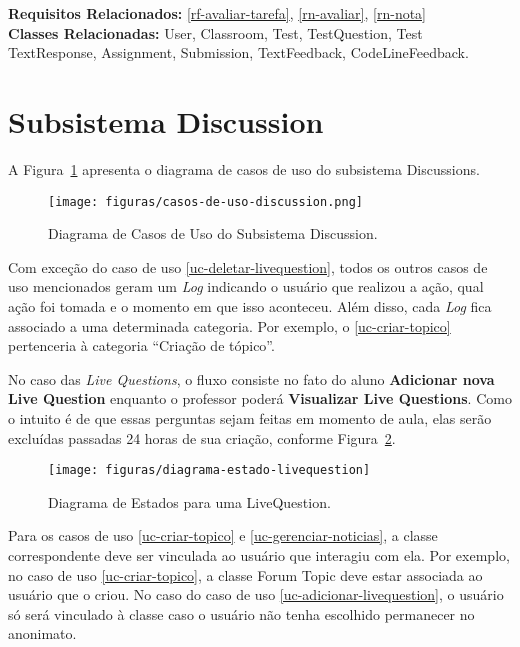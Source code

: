 \noindent  \textbf{Requisitos Relacionados:} \ref{rf-avaliar-tarefa}, \ref{rn-avaliar}, \ref{rn-nota}       \\ \textbf{Classes Relacionadas:} User, Classroom, Test, TestQuestion, Test TextResponse, Assignment, Submission, TextFeedback, CodeLineFeedback.


\newpage
\section{Subsistema Discussion}

A Figura~\ref{figura-caso-de-uso-discussion} apresenta o diagrama de casos de uso do subsistema Discussions.

\begin{figure}[h!]
	\centering
	\texttt{[image: figuras/casos-de-uso-discussion.png]}
	\caption{Diagrama de Casos de Uso do Subsistema Discussion.}
	\label{figura-caso-de-uso-discussion}
\end{figure}

Com exceção do caso de uso \ref{uc-deletar-livequestion}, todos os outros casos de uso mencionados geram um \textit{Log} indicando o usuário que realizou a ação, qual ação foi tomada e o momento em que isso aconteceu. Além disso, cada \textit{Log} fica associado a uma determinada categoria. Por exemplo, o \ref{uc-criar-topico} pertenceria à categoria ``Criação de tópico''.

No caso das \textit{Live Questions}, o fluxo consiste no fato do aluno \textbf{Adicionar nova Live Question} enquanto o professor poderá \textbf{Visualizar Live Questions}. Como o intuito é de que essas perguntas sejam feitas em momento de aula, elas serão excluídas passadas 24 horas de sua criação, conforme Figura~\ref{fig-requisitos-discussion-diagrama-estado}.

\begin{figure}[h]
	\centering
	\texttt{[image: figuras/diagrama-estado-livequestion]}
	\caption{Diagrama de Estados para uma LiveQuestion.}
	\label{fig-requisitos-discussion-diagrama-estado}
\end{figure}

Para os casos de uso \ref{uc-criar-topico} e \ref{uc-gerenciar-noticias}, a classe correspondente deve ser vinculada ao usuário que interagiu com ela. Por exemplo, no caso de uso \ref{uc-criar-topico}, a classe Forum Topic deve estar associada ao usuário que o criou. No caso do caso de uso \ref{uc-adicionar-livequestion}, o usuário só será vinculado à classe caso o usuário não tenha escolhido permanecer no anonimato.

